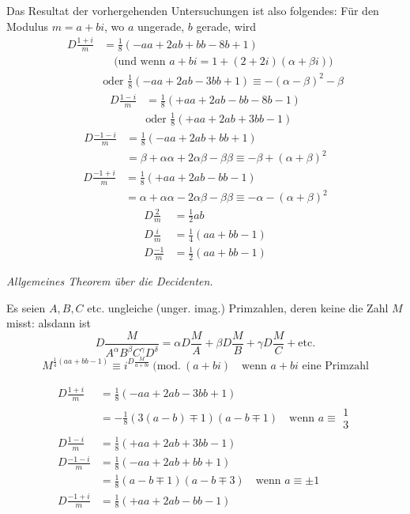 Das Resultat der vorhergehenden Untersuchungen ist also folgendes:
Für den Modulus $m=a+bi$, wo $a$ ungerade, $b$ gerade, wird
\[
\begin{aligned}
D\frac{1+i}{m}&=\tfrac18(-aa+2ab+bb-8b+1)\\
&\quad\text{(und wenn }a+bi=1+(2+2i)(\alpha+\beta i))\\
&\text{oder }\tfrac18(-aa+2ab-3bb+1)\equiv-(\alpha-\beta)^2-\beta
\end{aligned}
\]
\[
\begin{aligned}
D\frac{1-i}{m}&=\tfrac18(+aa+2ab-bb-8b-1)\\
&\text{oder }\tfrac18(+aa+2ab+3bb-1)
\end{aligned}
\]
\[
\begin{aligned}
D\frac{-1-i}{m}&=\tfrac18(-aa+2ab+bb+1)\\
&=\beta+\alpha\alpha+2\alpha\beta-\beta\beta\equiv-\beta+(\alpha+\beta)^2
\end{aligned}
\]
\[
\begin{aligned}
D\frac{-1+i}{m}&=\tfrac18(+aa+2ab-bb-1)\\
&=\alpha+\alpha\alpha-2\alpha\beta-\beta\beta\equiv-\alpha-(\alpha+\beta)^2
\end{aligned}
\]
\[
\begin{aligned}
D\frac2m&=\tfrac12ab\\
D\frac im&=\tfrac14(aa+bb-1)\\
D\frac{-1}m&=\tfrac12(aa+bb-1)
\end{aligned}
\]

\begin{center}\emph{Allgemeines Theorem über die Decidenten.}\end{center}
Es seien $A,B,C$ etc. ungleiche (unger. imag.) Primzahlen, deren keine die Zahl $M$ misst: alsdann ist
\[
D\frac{M}{A^\alpha B^\beta C^\gamma D^\delta}=\alpha D\frac MA+\beta D\frac MB+\gamma D\frac MC+\text{etc.}
\]
\[
M^{\frac14(aa+bb-1)}\equiv i^{D\frac{M}{a+bi}}\ (\mathrm{mod.}\ (a+bi)\quad\text{wenn }a+bi\text{ eine Primzahl}
\]

\[
\begin{aligned}
D\frac{1+i}m&=\tfrac18(-aa+2ab-3bb+1)\\
&=-\tfrac18(3(a-b)\mp1)(a-b\mp1)\quad\text{wenn }a\equiv\substack{1\\3}\\
D\frac{1-i}m&=\tfrac18(+aa+2ab+3bb-1)\\
D\frac{-1-i}m&=\tfrac18(-aa+2ab+bb+1)\\
&=\tfrac18(a-b\mp1)(a-b\mp3)\quad\text{wenn }a\equiv\pm1\\
D\frac{-1+i}m&=\tfrac18(+aa+2ab-bb-1)
\end{aligned}
\]

